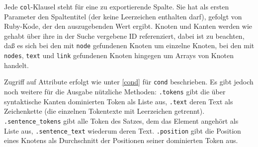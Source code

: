 \documentclass[12pt]{scrartcl}
\begin{document}
Jede \texttt{col}-Klausel steht für eine zu exportierende Spalte. Sie hat als ersten Parameter den Spaltentitel (der keine Leerzeichen enthalten darf), gefolgt von Ruby-Kode, der den auszugebenden Wert ergibt. Knoten und Kanten werden wie gehabt über ihre in der Suche vergebene ID referenziert, dabei ist zu beachten, daß es sich bei den mit \texttt{node} gefundenen Knoten um einzelne Knoten, bei den mit \texttt{nodes}, \texttt{text} und \texttt{link} gefundenen Knoten hingegen um Arrays von Knoten handelt.

Zugriff auf Attribute erfolgt wie unter \ref{cond} für \texttt{cond} beschrieben. Es gibt jedoch noch weitere für die Ausgabe nützliche Methoden: \texttt{.tokens} gibt die über syntaktische Kanten dominierten Token als Liste aus, \texttt{.text} deren Text als Zeichenkette (die einzelnen Tokentexte mit Leerzeichen getrennt). \texttt{.sentence\_tokens} gibt alle Token des Satzes, dem das Element angehört als Liste aus, \texttt{.sentence\_text} wiederum deren Text. \texttt{.position} gibt die Position eines Knotens als Durchschnitt der Positionen seiner dominierten Token aus.
\end{document}

